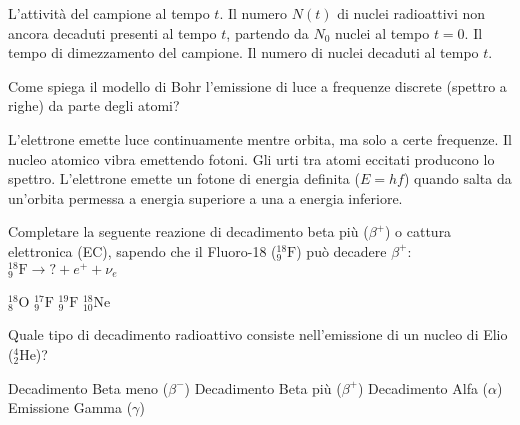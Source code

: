 \documentclass{exam}%
\begin{document}
\begin{questions}
\vspace{0.2em}%
\begin{choices}%
\choice L'attività del campione al tempo $t$.%
\choice Il numero $N(t)$ di nuclei radioattivi non ancora decaduti presenti al tempo $t$, partendo da $N_0$ nuclei al tempo $t=0$.%
\choice Il tempo di dimezzamento del campione.%
\choice Il numero di nuclei decaduti al tempo $t$.%
\end{choices}%
\question Come spiega il modello di Bohr l'emissione di luce a frequenze discrete (spettro a righe) da parte degli atomi?%
\vspace{0.2em}%
\begin{choices}%
\choice L'elettrone emette luce continuamente mentre orbita, ma solo a certe frequenze.%
\choice Il nucleo atomico vibra emettendo fotoni.%
\choice Gli urti tra atomi eccitati producono lo spettro.%
\choice L'elettrone emette un fotone di energia definita ($E = hf$) quando salta da un'orbita permessa a energia superiore a una a energia inferiore.%
\end{choices}%
\question Completare la seguente reazione di decadimento beta più ($\beta^+$) o cattura elettronica (EC), sapendo che il Fluoro-18 ($^{18}_{9}\text{F}$) può decadere $\beta^+$: $^{18}_{9}\text{F} \rightarrow ? + e^+ + \nu_e$%
\vspace{0.2em}%
\begin{multicols}{4}%
\begin{choices}%
\choice $^{18}_{8}\text{O}$%
\choice $^{17}_{9}\text{F}$%
\choice $^{19}_{9}\text{F}$%
\choice $^{18}_{10}\text{Ne}$%
\end{choices}%
\end{multicols}%
\question Quale tipo di decadimento radioattivo consiste nell'emissione di un nucleo di Elio ($^4_2\text{He}$)?%
\vspace{0.2em}%
\begin{multicols}{2}%
\begin{choices}%
\choice Decadimento Beta meno ($\beta^-$)%
\choice Decadimento Beta più ($\beta^+$)%
\choice Decadimento Alfa ($\alpha$)%
\choice Emissione Gamma ($\gamma$)%
\end{choices}%
\end{multicols}%
\end{questions}%
\end{document}
